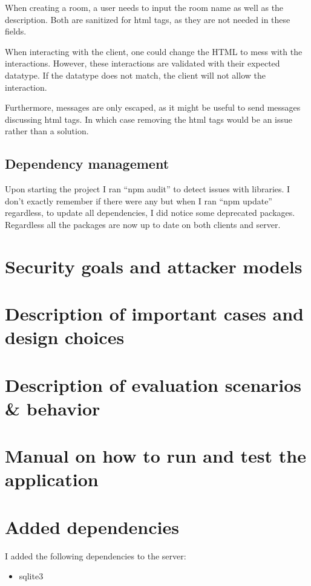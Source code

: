 \documentclass[a4paper]{article}
\begin{document}
When creating a room, a user needs to input the room name as well as the description. Both are sanitized for html tags, as they are not needed in these fields.

When interacting with the client, one could change the HTML to mess with the interactions. However, these interactions are validated with their expected datatype. If the datatype does not match, the client will not allow the interaction.

Furthermore, messages are only escaped, as it might be useful to send messages discussing html tags. In which case removing the html tags would be an issue rather than a solution.

\subsection{Dependency management}
Upon starting the project I ran \enquote{npm audit} to detect issues with libraries. I don't exactly remember if there were any but when I ran \enquote{npm update} regardless, to update all dependencies, I did notice some deprecated packages. Regardless all the packages are now up to date on both clients and server.
\section{Security goals and attacker models}

\newpage
\section{Description of important cases and design choices}

\newpage
\section{Description of evaluation scenarios \& behavior}

\newpage
\section{Manual on how to run and test the application}

\newpage
\section{Added dependencies}
I added the following dependencies to the server:
\begin{itemize}
    \item sqlite3
\end{itemize}
\end{document}
